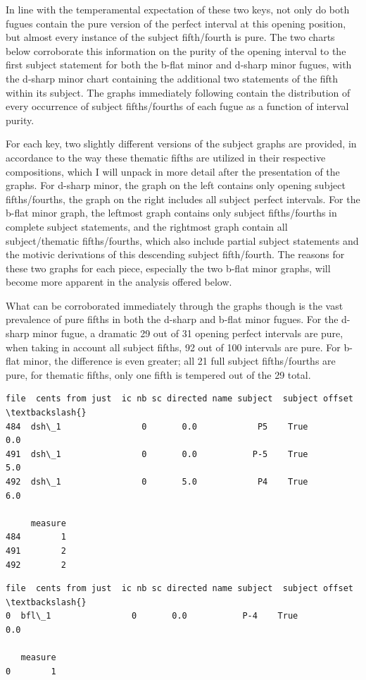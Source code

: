In line with the temperamental expectation of these two keys, not only
do both fugues contain the pure version of the perfect interval at this
opening position, but almost every instance of the subject fifth/fourth
is pure. The two charts below corroborate this information on the purity
of the opening interval to the first subject statement for both the
b-flat minor and d-sharp minor fugues, with the d-sharp minor chart
containing the additional two statements of the fifth within its
subject. The graphs immediately following contain the distribution of
every occurrence of subject fifths/fourths of each fugue as a function
of interval purity.

For each key, two slightly different versions of the subject graphs are
provided, in accordance to the way these thematic fifths are utilized in
their respective compositions, which I will unpack in more detail after
the presentation of the graphs. For d-sharp minor, the graph on the left
contains only opening subject fifths/fourths, the graph on the right
includes all subject perfect intervals. For the b-flat minor graph, the
leftmost graph contains only subject fifths/fourths in complete subject
statements, and the rightmost graph contain all subject/thematic
fifths/fourths, which also include partial subject statements and the
motivic derivations of this descending subject fifth/fourth. The reasons
for these two graphs for each piece, especially the two b-flat minor
graphs, will become more apparent in the analysis offered below.

What can be corroborated immediately through the graphs though is the
vast prevalence of pure fifths in both the d-sharp and b-flat minor
fugues. For the d-sharp minor fugue, a dramatic 29 out of 31 opening
perfect intervals are pure, when taking in account all subject fifths,
92 out of 100 intervals are pure. For b-flat minor, the difference is
even greater; all 21 full subject fifths/fourths are pure, for thematic
fifths, only one fifth is tempered out of the 29 total.

\begin{Verbatim}[commandchars=\\\{\}]
      file  cents from just  ic nb sc directed name subject  subject offset  \textbackslash{}
484  dsh\_1                0       0.0            P5    True             0.0   
491  dsh\_1                0       0.0           P-5    True             5.0   
492  dsh\_1                0       5.0            P4    True             6.0   

     measure  
484        1  
491        2  
492        2  
\end{Verbatim}
\begin{Verbatim}[commandchars=\\\{\}]
    file  cents from just  ic nb sc directed name subject  subject offset  \textbackslash{}
0  bfl\_1                0       0.0           P-4    True             0.0   

   measure  
0        1  
\end{Verbatim}


